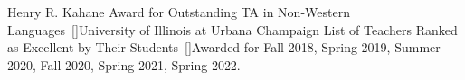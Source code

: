 \begin{talks}
    \award
    {Henry R. Kahane Award for Outstanding TA in Non-Western Languages}{}{\normalfont ~[\href{https://linguistics.illinois.edu/resources/libraries-and-reading-rooms/henry-and-renee-kahane-linguistics-research-room}{\small{\websiteSymbol}}]}{University of Illinois at Urbana Champaign}
    \award
    {List of Teachers Ranked as Excellent by Their Students}{}{\normalfont ~[\href{https://citl.illinois.edu/citl-101/measurement-evaluation/teaching-evaluation/teaching-evaluations-(ices)/teachers-ranked-as-excellent}{\small{\websiteSymbol}}]}{Awarded for Fall 2018, Spring 2019, Summer 2020, Fall 2020, Spring 2021, Spring 2022.}
\end{talks}    
\vspace{-3mm}

